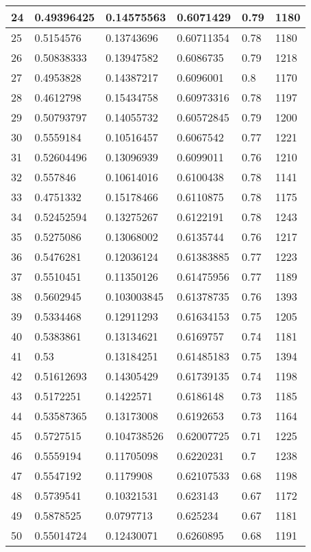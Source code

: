 \begin{longtable}{|l|l|l|l|l|l|}
24 & 0.49396425 & 0.14575563 & 0.6071429 & 0.79 & 1180 \\ \hline 
25 & 0.5154576 & 0.13743696 & 0.60711354 & 0.78 & 1180 \\ \hline 
26 & 0.50838333 & 0.13947582 & 0.6086735 & 0.79 & 1218 \\ \hline 
27 & 0.4953828 & 0.14387217 & 0.6096001 & 0.8 & 1170 \\ \hline 
28 & 0.4612798 & 0.15434758 & 0.60973316 & 0.78 & 1197 \\ \hline 
29 & 0.50793797 & 0.14055732 & 0.60572845 & 0.79 & 1200 \\ \hline 
30 & 0.5559184 & 0.10516457 & 0.6067542 & 0.77 & 1221 \\ \hline 
31 & 0.52604496 & 0.13096939 & 0.6099011 & 0.76 & 1210 \\ \hline 
32 & 0.557846 & 0.10614016 & 0.6100438 & 0.78 & 1141 \\ \hline 
33 & 0.4751332 & 0.15178466 & 0.6110875 & 0.78 & 1175 \\ \hline 
34 & 0.52452594 & 0.13275267 & 0.6122191 & 0.78 & 1243 \\ \hline 
35 & 0.5275086 & 0.13068002 & 0.6135744 & 0.76 & 1217 \\ \hline 
36 & 0.5476281 & 0.12036124 & 0.61383885 & 0.77 & 1223 \\ \hline 
37 & 0.5510451 & 0.11350126 & 0.61475956 & 0.77 & 1189 \\ \hline 
38 & 0.5602945 & 0.103003845 & 0.61378735 & 0.76 & 1393 \\ \hline 
39 & 0.5334468 & 0.12911293 & 0.61634153 & 0.75 & 1205 \\ \hline 
40 & 0.5383861 & 0.13134621 & 0.6169757 & 0.74 & 1181 \\ \hline 
41 & 0.53 & 0.13184251 & 0.61485183 & 0.75 & 1394 \\ \hline 
42 & 0.51612693 & 0.14305429 & 0.61739135 & 0.74 & 1198 \\ \hline 
43 & 0.5172251 & 0.1422571 & 0.6186148 & 0.73 & 1185 \\ \hline 
44 & 0.53587365 & 0.13173008 & 0.6192653 & 0.73 & 1164 \\ \hline 
45 & 0.5727515 & 0.104738526 & 0.62007725 & 0.71 & 1225 \\ \hline 
46 & 0.5559194 & 0.11705098 & 0.6220231 & 0.7 & 1238 \\ \hline 
47 & 0.5547192 & 0.1179908 & 0.62107533 & 0.68 & 1198 \\ \hline 
48 & 0.5739541 & 0.10321531 & 0.623143 & 0.67 & 1172 \\ \hline 
49 & 0.5878525 & 0.0797713 & 0.625234 & 0.67 & 1181 \\ \hline 
50 & 0.55014724 & 0.12430071 & 0.6260895 & 0.68 & 1191 \\ \hline 
\end{longtable}